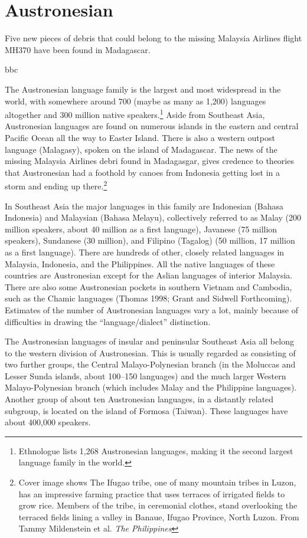 
\chapter{Austronesian}

\epigraph{Five new pieces of debris that could belong to the missing Malaysia Airlines flight \textsc{MH370} have been found in Madagascar.}{bbc}

The Austronesian language family is the largest and most widespread in the
world, with somewhere around 700 (maybe as many as 1,200) languages
altogether and 300 million native speakers.\footnote{Ethnologue lists 1,268
Austronesian languages, making it the second largest language family in the world.}
Aside from Southeast Asia, Austronesian languages are found on numerous islands in the eastern and
central Pacific Ocean all the way to Easter Island. There is also a western
outpost language (Malagasy), spoken on the island of Madagascar. The news of the missing Malaysia Airlines debri found in
Madagasgar, gives credence to theories that Austronesian had a foothold by canoes from Indonesia getting lost in a storm and ending up there.\footnote{Cover image shows The Ifugao tribe, one of many mountain tribes in Luzon, has an impressive
farming practice that uses terraces of irrigated fields to grow rice. Members
of the tribe, in ceremonial clothes, stand overlooking the terraced fields
lining a valley in Banaue, Ifugao Province, North Luzon. From Tammy Mildenstein et al. \textit{The Philippines}}

In Southeast Asia the major languages in this family are Indonesian
(Bahasa Indonesia) and Malaysian (Bahasa Melayu), collectively referred
to as Malay (200 million speakers, about 40 million as a first language),
Javanese (75 million speakers), Sundanese (30 million), and Filipino
(Tagalog) (50 million, 17 million as a first language). There are hundreds of
other, closely related languages in Malaysia, Indonesia, and the Philippines.
All the native languages of these countries are Austronesian except for the
Aslian languages of interior Malaysia. There are also some Austronesian
pockets in southern Vietnam and Cambodia, such as the Chamic languages
(Thomas 1998; Grant and Sidwell Forthcoming). Estimates of the number
of Austronesian languages vary a lot, mainly because of difficulties in
drawing the \enquote{language/dialect} distinction.

The Austronesian languages of insular and peninsular Southeast Asia all
belong to the western division of Austronesian. This is usually regarded
as consisting of two further groups, the Central Malayo-Polynesian branch
(in the Moluccas and Lesser Sunda islands, about 100–150 languages) and
the much larger Western Malayo-Polynesian branch (which includes Malay
and the Philippine languages). Another group of about ten Austronesian
languages, in a distantly related subgroup, is located on the island of Formosa
(Taiwan). These languages have about 400,000 speakers.

